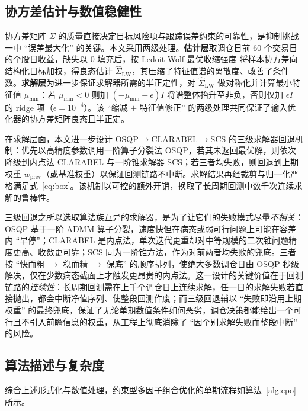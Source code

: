 \subsection{协方差估计与数值稳健性}
\label{subsec:cov}
协方差矩阵 $\Sigma$ 的质量直接决定目标风险项与跟踪误差约束的可靠性，是抑制挑战一中 ``误差最大化'' 的关键。本文采用两级处理。\textbf{估计层}取调仓日前 $60$ 个交易日的个股日收益，缺失以 $0$ 填充后，按 Ledoit-Wolf 最优收缩强度\cite{Ledoit2004} 将样本协方差向结构化目标加权，得良态估计 $\hat\Sigma_{\text{LW}}$，其压缩了特征值谱的离散度、改善了条件数。\textbf{求解层}为进一步保证求解器所需的半正定性，对 $\hat\Sigma_{\text{LW}}$ 做对称化并计算最小特征值 $\mu_{\min}$：若 $\mu_{\min}<0$ 则加 $(-\mu_{\min}+\epsilon)I$ 将谱整体抬升至非负，否则仅加 $\epsilon I$ 的 ridge 项（$\epsilon=10^{-4}$）。该 ``缩减 $+$ 特征值修正'' 的两级处理共同保证了输入优化器的协方差矩阵良态且半正定。

在求解层面，本文进一步设计 OSQP$\to$CLARABEL$\to$SCS 的三级求解器回退机制：优先以高精度参数调用一阶算子分裂法 OSQP，若其未返回最优解，则依次降级到内点法 CLARABEL 与一阶锥求解器 SCS；若三者均失败，则回退到上期权重 $w_{\text{prev}}$（或基准权重）以保证回测链路不中断。求解结果再经裁剪与归一化严格满足式~\eqref{eq:box}。该机制以可控的额外开销，换取了长周期回测中数千次连续求解的鲁棒性。

三级回退之所以选取算法族互异的求解器，是为了让它们的失败模式尽量\emph{不相关}：OSQP 基于一阶 ADMM 算子分裂，速度快但在病态或弱可行问题上可能在容差内 ``早停''；CLARABEL 是内点法，单次迭代更重却对中等规模的二次锥问题精度更高、收敛更可靠；SCS 同为一阶锥方法，作为对前两者均失败的兜底。三者按 ``快而粗 $\to$ 稳而精 $\to$ 保底'' 的顺序排列，使绝大多数调仓日由 OSQP 秒级解决，仅在少数病态截面上才触发更昂贵的内点法。这一设计的关键价值在于回测链路的\emph{连续性}：长周期回测需在上千个调仓日上连续求解，任一日的求解失败若直接抛出，都会中断净值序列、使整段回测作废；而三级回退辅以 ``失败即沿用上期权重'' 的最终兜底，保证了无论单期数值条件如何恶劣，调仓决策都能给出一个可行且不引入前瞻信息的权重，从工程上彻底消除了 ``因个别求解失败而整段中断'' 的风险。

\subsection{算法描述与复杂度}
\label{subsec:complexity}
综合上述形式化与数值处理，约束型多因子组合优化的单期流程如算法~\ref{alg:cpo} 所示。

